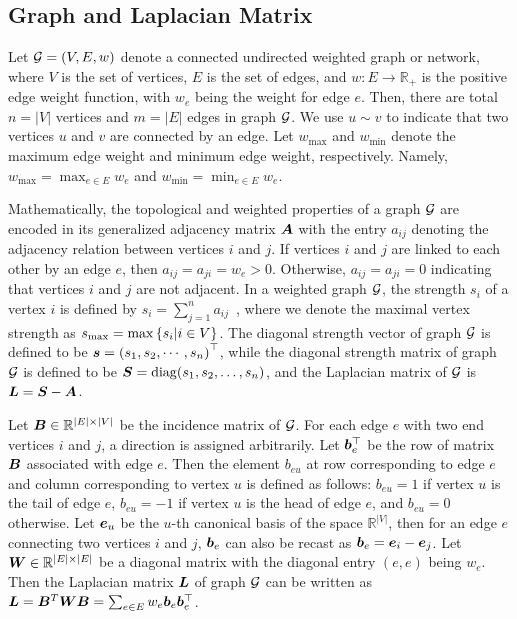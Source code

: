 \documentclass[journal]{IEEEtran}
\begin{document}
\subsection{Graph and Laplacian Matrix}\label{sub:lap}

Let \(\mathcal{G}=(V,E,w)\) denote a connected undirected weighted graph or network,  where \(V\) is the set of vertices,  \(E\) is the set of edges, and  \(w: E\to \mathbb{R}_{+}\) is the positive edge weight function, with \(w_e\) being the weight for edge \(e\). Then, there are total \(n=|V|\) vertices and \(m=|E|\) edges in graph \(\mathcal{G}\). We use \(u \sim v\) to indicate that two vertices \(u\) and \(v\) are connected by an edge. Let \(w_{\max}\) and \(w_{\min}\) denote the maximum edge weight and minimum edge weight, respectively. Namely, \(w_{\max}=\max_{e\in E} w_e \) and \(w_{\min}=\min_{e\in E} w_e\).

Mathematically, the topological and weighted properties of a graph \(\mathcal{G}\) are encoded in its generalized adjacency matrix \(\boldsymbol{A}\) with the entry \(a_{ij}\) denoting the adjacency relation between vertices \(i\) and \(j\). If vertices \(i\) and \(j\) are linked to each other by an edge \(e\), then \(a_{ij}= a_{ji}=w_{e}> 0\). Otherwise, \(a_{ij}=a_{ji}=0\) indicating that vertices \(i\) and \(j\) are not adjacent. In a weighted graph \(\mathcal{G}\), the strength  \(s_i\) of a vertex \(i\) is defined by \(s_i=\sum_{j=1}^n a_{ij}\)~\cite{BaBaPaVe04}, where we denote the maximal vertex strength as \(s_{\max}=\max\left\{s_i|i\in V \right\}\).
The diagonal strength vector of graph \(\mathcal{G}\) is defined to be \(\boldsymbol{s}=\left( s_1,s_2,\cdots,s_n \right)^\top\), while the diagonal strength matrix of graph \(\mathcal{G}\) is defined to be \({\boldsymbol{S}} = {\rm diag}(s_1, s_2, \ldots, s_n)\), and the Laplacian matrix of \(\mathcal{G}\) is \({\boldsymbol{L}}={\boldsymbol{S}}-{\boldsymbol{A}}\).

Let \(\boldsymbol{B} \in \mathbb{R}^{|E| \times |V|}\) be the incidence matrix of \(\mathcal{G}\). For each edge \(e\) with two end vertices \(i\) and \(j\), a direction is assigned arbitrarily. Let \(\boldsymbol{b}_e^\top\) be the row of matrix \(\boldsymbol{B}\) associated with edge \(e\). Then the element \(b_{eu}\) at row corresponding to edge \(e\) and column corresponding to vertex \(u\) is defined as follows: \(b_{eu} = 1\) if vertex \(u\) is the tail of edge \(e\), \(b_{eu}=-1\) if vertex \(u\) is the head of  edge \(e\), and \(b_{eu}=0\) otherwise. Let \(\boldsymbol{e}_u\) be the \(u\)-th canonical basis of the space \(\mathbb{R}^{|V|}\), then for an edge \(e\) connecting two vertices \(i\) and \(j\), \(\boldsymbol{b}_e\) can also be recast as \(\boldsymbol{b}_e=\boldsymbol{e}_{i}-\boldsymbol{e}_{j}\).  Let  \(\boldsymbol{W} \in \mathbb{R}^{|E| \times |E|}\) be a diagonal matrix with the diagonal entry \((e,e)\) being \(w_e\). Then the Laplacian matrix \(\boldsymbol{L}\) of graph \(\mathcal{G}\) can be written as \(\boldsymbol{L}=\boldsymbol{B}^T\boldsymbol{W}\boldsymbol{B}=\sum_{e\in E}w_e\boldsymbol{b}_e\boldsymbol{b}_e^{\top}\).
\end{document}
